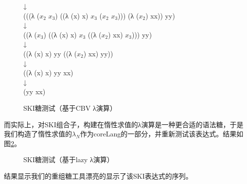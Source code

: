 \begin{figure}[ht]
\begin{center}
{{\begin{center}
{						↓\\
						(((λ ($x_{2}$ $x_{3}$) ((λ (x) x) $x_{3}$ ($x_{2}$ $x_{3}$))) (λ ($x_{2}$) xx)) yy)\\
						↓\\
						((λ ($x_{3}$) ((λ (x) x) $x_{3}$ ((λ ($x_{2}$) xx) $x_{3}$))) yy)\\
						↓\\
						((λ (x) x) yy ((λ ($x_{2}$) xx) yy))\\
						↓\\
						((λ (x) x) yy xx)\\
						↓\\
						(yy xx)}
				\end{center}
				
			}
		}
	\end{center}
	\caption{SKI糖测试（基于CBV λ演算）}
	\label{fig:SKI1}
\end{figure}


而实际上，对SKI组合子，构建在惰性求值的λ演算是一种更合适的语法糖，于是我们构造了惰性求值的$\lambda_{N}$作为coreLang的一部分，并重新测试该表达式。结果如图\ref{fig:SKI2}。
\begin{figure}[H]
	\begin{center}
	\end{center}
	\caption{SKI糖测试（基于lazy λ演算）}
	\label{fig:SKI2}
\end{figure}


结果显示我们的重组糖工具漂亮的显示了该SKI表达式的序列。

